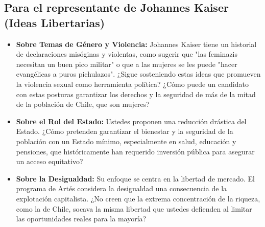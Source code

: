 \documentclass[a4paper, 11pt]{article}
\begin{document}
\subsection{Para el representante de Johannes Kaiser (Ideas Libertarias)}
\begin{itemize}
    \item \textbf{Sobre Temas de Género y Violencia:} Johannes Kaiser tiene un historial de declaraciones misóginas y violentas, como sugerir que "las feminazis necesitan un buen pico militar" o que a las mujeres se les puede "hacer evangélicas a puros pichulazos". ¿Sigue sosteniendo estas ideas que promueven la violencia sexual como herramienta política? ¿Cómo puede un candidato con estas posturas garantizar los derechos y la seguridad de más de la mitad de la población de Chile, que son mujeres?

    \item \textbf{Sobre el Rol del Estado:} Ustedes proponen una reducción drástica del Estado. ¿Cómo pretenden garantizar el bienestar y la seguridad de la población con un Estado mínimo, especialmente en salud, educación y pensiones, que históricamente han requerido inversión pública para asegurar un acceso equitativo?
    
    \item \textbf{Sobre la Desigualdad:} Su enfoque se centra en la libertad de mercado. El programa de Artés considera la desigualdad una consecuencia de la explotación capitalista. ¿No creen que la extrema concentración de la riqueza, como la de Chile, socava la misma libertad que ustedes defienden al limitar las oportunidades reales para la mayoría?
\end{itemize}

\end{document}
